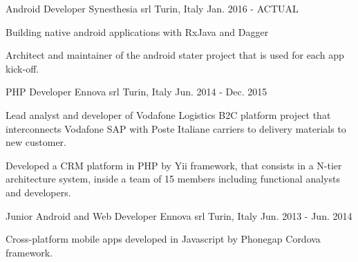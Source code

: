 


\begin{cventries}


\cventry
{Android Developer} %
{Synesthesia srl} %
{Turin, Italy} %
{Jan. 2016 - ACTUAL} %
{ %
	\begin{cvitems}
		\item {Building native android applications with RxJava and Dagger}
		\item {Architect and maintainer of the android stater project that is used for each app kick-off.}
	\end{cvitems}
}


\cventry
{PHP Developer} %
{Ennova srl} %
{Turin, Italy} %
{Jun. 2014 - Dec. 2015} %
{ %
	\begin{cvitems}
		\item {Lead analyst and developer of Vodafone Logistics B2C platform project that interconnects Vodafone SAP with Poste Italiane carriers to delivery materials to new customer. }
		\item {Developed a CRM platform in PHP by Yii framework, that consists in a N-tier architecture system, inside a team of 15 members including functional analysts and developers. }
	\end{cvitems}
}


\cventry
{Junior Android and Web Developer} %
{Ennova srl} %
{Turin, Italy} %
{Jun. 2013 - Jun. 2014} %
{ %
	\begin{cvitems}
		\item {Cross-platform mobile apps developed in Javascript by Phonegap Cordova framework.}
	\end{cvitems}
}


\end{cventries}